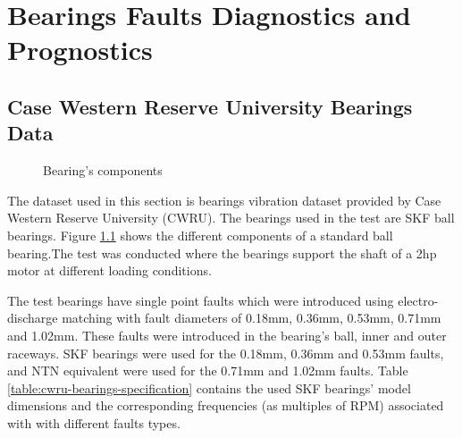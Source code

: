 \chapter{Bearings Faults Diagnostics and Prognostics}%
\label{chapter:bearings_faults_diagnostics_and_prognostics}


\section{Case Western Reserve University Bearings Data}

\begin{figure}
    \centering
	
	\caption{Bearing's components}
    \label{figure:skf-bearing-components}    
\end{figure}
\vspace{-1em}

The dataset used in this section is bearings vibration dataset provided by Case Western Reserve University (CWRU). The bearings used in the test are SKF ball bearings. Figure \ref{figure:skf-bearing-components} shows the different components of a standard ball bearing.The test was conducted where the bearings support the shaft of a 2hp motor at different loading conditions. 

The test bearings have single point faults which were introduced using electro-discharge matching with fault diameters of 0.18mm, 0.36mm, 0.53mm, 0.71mm and 1.02mm. These faults were introduced in the bearing's ball, inner and outer raceways. SKF bearings were used for the 0.18mm, 0.36mm and 0.53mm faults, and NTN equivalent were used for the 0.71mm and 1.02mm faults. Table \ref{table:cwru-bearings-specification} contains the used SKF bearings' model dimensions and the corresponding frequencies (as multiples of RPM) associated with with different faults types.

